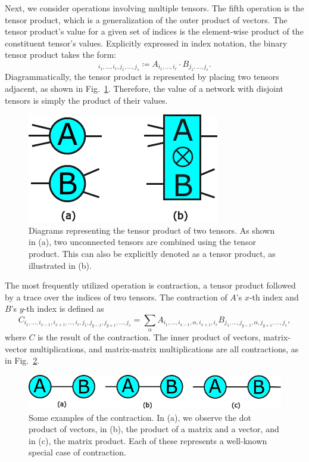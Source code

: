\documentclass[12pt,dvipdfmx,twoside,openright]{report}
\begin{document}
Next, we consider operations involving multiple tensors.
The fifth operation is the tensor product, which is a generalization of the outer product of vectors.
The tensor product's value for a given set of indices is the element-wise product of the constituent tensor's values.
Explicitly expressed in index notation, the binary tensor product takes the form:
\begin{equation}
    [A\otimes B]_{i_1,\dots,i_r,j_1,\dots,j_s}\coloneqq A_{i_1,\dots,i_r}\cdot B_{j_1,\dots,j_s}.
\end{equation}
Diagrammatically, the tensor product is represented by placing two tensors adjacent, as shown in Fig.~\ref{fig:tensor-product}.
Therefore, the value of a network with disjoint tensors is simply the product of their values.
\begin{figure}
    \centering
    \includegraphics[width=0.4\linewidth]{tensor-product.pdf}
    \caption{Diagrams representing the tensor product of two tensors.
    As shown in (a), two unconnected tensors are combined using the tensor product. 
    This can also be explicitly denoted as a tensor product, as illustrated in (b).}
    \label{fig:tensor-product}
\end{figure}

The most frequently utilized operation is contraction, a tensor product followed by a trace over the indices of two tensors.
The contraction of $A$'s $x$-th index and $B$'s $y$-th index is defined as
\begin{equation}
    C_{i_1,\dots,i_{x-1},i_{x+1},\dots,i_r,j_1,j_{y-1},j_{y+1},\dots,j_s}=\sum_\alpha A_{i_1,\dots,i_{x-1},\alpha,i_{x+1},i_r}B_{j_1,\dots,j_{y-1},\alpha,j_{y+1},\dots,j_s},
\end{equation}
where $C$ is the result of the contraction.
The inner product of vectors, matrix-vector multiplications, and matrix-matrix multiplications are all contractions, as in Fig.~\ref{fig:contraction}.
\begin{figure}
    \centering
    \includegraphics[width=0.8\linewidth]{fig-contraction.pdf}
    \caption{Some examples of the contraction.
    In (a), we observe the dot product of vectors, in (b), the product of a matrix and a vector, and in (c), the matrix product. 
    Each of these represents a well-known special case of contraction.}
    \label{fig:contraction}
\end{figure}
\end{document}
